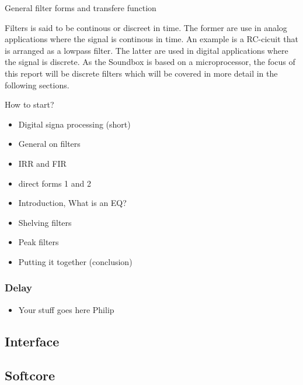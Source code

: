 \documentclass[12p]{article}
\begin{document}
General filter forms and transfere function



Filters is said to be continous or discreet in time. The former are use in analog applications where the signal is continous in time. An example is a RC-cicuit that is arranged as a lowpass filter. The latter are used in digital applications where the signal is discrete. As the Soundbox is based on a microprocessor, the focus of this report will be discrete filters which will be covered in more detail in the following sections.

\emph{}
How to start?












\begin{itemize}
\item Digital signa processing (short)
\item General on filters
\item IRR and FIR
\item direct forms 1 and 2
\item Introduction, What is an EQ?
\item Shelving filters
\item Peak filters
\item Putting it together (conclusion)
\end{itemize}

\subsubsection{Delay}
\begin{itemize}
\item Your stuff goes here Philip
\end{itemize}

\subsection{Interface}
\label{Theory:Interface}

\subsection{Softcore}
\label{Theory:Softcore}
\end{document}
